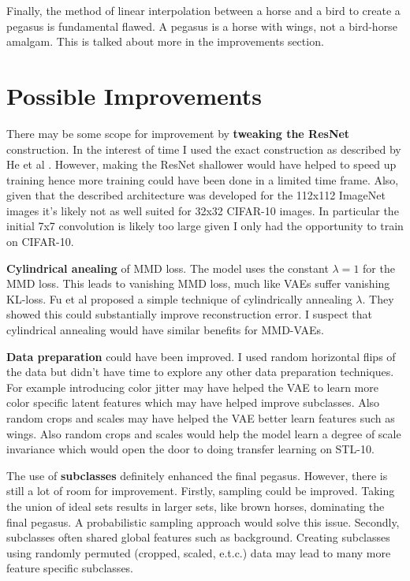 \documentclass{article}
\begin{document}
Finally, the method of linear interpolation between a horse and a bird to create a pegasus is fundamental flawed. A pegasus is a horse with wings, not a bird-horse amalgam. This is talked about more in the improvements section.  



\section{Possible Improvements}
There may be some scope for improvement by \textbf{tweaking the ResNet} construction. In the interest of time I used the exact construction as described by He et al \cite{ResNet}. However, making the ResNet shallower would have helped to speed up training hence more training could have been done in a limited time frame. Also, given that the described architecture was developed for the 112x112 ImageNet images it's likely not as well suited for 32x32 CIFAR-10 images. In particular the initial 7x7 convolution is likely too large given I only had the opportunity to train on CIFAR-10.

\textbf{Cylindrical anealing} of MMD loss. The model uses the constant $\lambda=1$ for the MMD loss. This leads to vanishing MMD loss, much like VAEs suffer vanishing KL-loss. Fu et al \cite{cylindricalAnnealing} proposed a simple technique of cylindrically annealing $\lambda$. They showed this could substantially improve reconstruction error. I suspect that cylindrical annealing would have similar benefits for MMD-VAEs.

\textbf{Data preparation} could have been improved. I used random horizontal flips of the data but didn't have time to explore any other data preparation techniques. For example introducing color jitter may have helped the VAE to learn more color specific latent features which may have helped improve subclasses. Also random crops and scales may have helped the VAE better learn features such as wings. Also random crops and scales would help the model learn a degree of scale invariance which would open the door to doing transfer learning on STL-10.  

The use of \textbf{subclasses} definitely enhanced the final pegasus. However, there is still a lot of room for improvement. Firstly, sampling could be improved. Taking the union of ideal sets results in larger sets, like brown horses, dominating the final pegasus. A probabilistic sampling approach would solve this issue. Secondly, subclasses often shared global features such as background. Creating subclasses using randomly permuted (cropped, scaled, e.t.c.) data may lead to many more feature specific subclasses.
\end{document}
